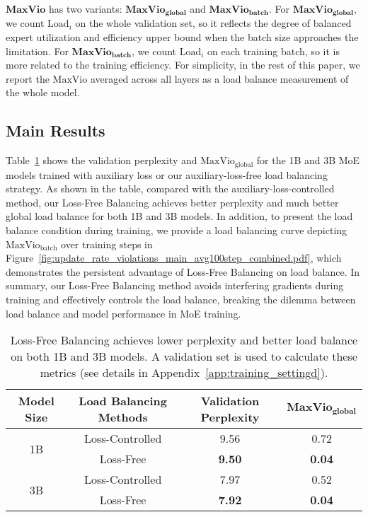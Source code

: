 \documentclass{article} %
\newcommand{\ours}{Loss-Free Balancing}
\newcommand{\Ours}{Loss-Free Balancing}
\begin{document}
$\textbf{MaxVio}$ has two variants: $\textbf{MaxVio}_\textbf{global}$ and $\textbf{MaxVio}_\textbf{batch}$. 
For $\textbf{MaxVio}_\textbf{global}$, we count $\text{Load}_{i}$ on the whole validation set, so it reflects the degree of balanced expert utilization and efficiency upper bound when the batch size approaches the limitation. 
For $\textbf{MaxVio}_\textbf{batch}$, we count $\text{Load}_{i}$ on each training batch, so it is more related to the training efficiency. 
For simplicity, in the rest of this paper, we report the $\text{MaxVio}$ averaged across all layers as a load balance measurement of the whole model.  

\subsection{Main Results}
Table~\ref{tab:main_results} shows the validation perplexity and $\text{MaxVio}_\text{global}$ for the 1B and 3B MoE models trained with auxiliary loss or our auxiliary-loss-free load balancing strategy.
As shown in the table, compared with the auxiliary-loss-controlled method, our \ours{} achieves better perplexity and much better global load balance for both 1B and 3B models. 
In addition, to present the load balance condition during training, we provide a load balancing curve depicting $\text{MaxVio}_\text{batch}$ over training steps in Figure~\ref{fig:update_rate_violations_main_avg100step_combined.pdf}, which demonstrates the persistent advantage of \ours{} on load balance. 
In summary, our \ours{} method avoids interfering gradients during training and effectively controls the load balance, breaking the dilemma between load balance and model performance in MoE training.

\begin{table}[t]
\caption{\Ours{} achieves lower perplexity and better load balance on both 1B and 3B models. A validation set is used to calculate these metrics (see details in Appendix~\ref{app:training_settingd}).}
\label{tab:main_results}
\begin{center}
\begin{tabular}{cc|cc}
\toprule
\textbf{Model Size} & \textbf{Load Balancing Methods} & \textbf{Validation Perplexity} &  $\textbf{MaxVio}_\textbf{global}$\\
\midrule
\multirow{2}{*}{1B}  & Loss-Controlled & 9.56 & 0.72 \\
& Loss-Free & \textbf{9.50} & \textbf{0.04} \\ 

\hline
\multirow{2}{*}{3B}  & Loss-Controlled & 7.97 &  0.52 \\
& Loss-Free & \textbf{7.92} & \textbf{0.04} \\ 

\bottomrule
\end{tabular}
\end{center}
\end{table}
\end{document}
